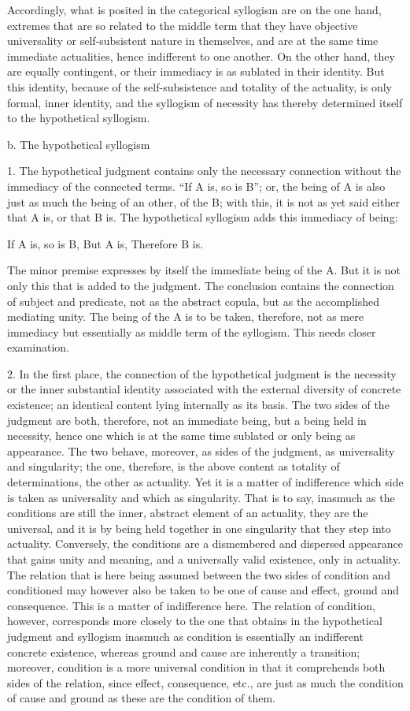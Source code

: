 Accordingly, what is posited
in the categorical syllogism are
on the one hand,
extremes that are so related to the middle term
that they have objective universality
or self-subsistent nature in themselves,
and are at the same time immediate actualities,
hence indifferent to one another.
On the other hand,
they are equally contingent,
or their immediacy is as sublated in their identity.
But this identity, because of the self-subsistence
and totality of the actuality,
is only formal, inner identity,
and the syllogism of necessity has thereby
determined itself to the hypothetical syllogism.

b. The hypothetical syllogism

1. The hypothetical judgment contains only
the necessary connection without
the immediacy of the connected terms.
“If A is, so is B”;
or, the being of A is also just as much
the being of an other, of the B;
with this, it is not as yet said either that A is, or that B is.
The hypothetical syllogism adds this immediacy of being:

If A is, so is B,
But A is,
Therefore B is.

The minor premise expresses by itself
the immediate being of the A.
But it is not only this that is added to the judgment.
The conclusion contains the connection of subject and predicate,
not as the abstract copula,
but as the accomplished mediating unity.
The being of the A is to be taken, therefore,
not as mere immediacy but essentially
as middle term of the syllogism.
This needs closer examination.

2. In the first place,
the connection of the hypothetical judgment is
the necessity or the inner substantial identity
associated with the external diversity of concrete existence;
an identical content lying internally as its basis.
The two sides of the judgment are both, therefore,
not an immediate being, but a being held in necessity,
hence one which is at the same time sublated
or only being as appearance.
The two behave, moreover, as sides of the judgment,
as universality and singularity;
the one, therefore, is the above content
as totality of determinations,
the other as actuality.
Yet it is a matter of indifference
which side is taken as universality
and which as singularity.
That is to say, inasmuch as
the conditions are still the inner,
abstract element of an actuality,
they are the universal,
and it is by being held together
in one singularity
that they step into actuality.
Conversely, the conditions are
a dismembered and dispersed appearance
that gains unity and meaning,
and a universally valid existence,
only in actuality.
The relation that is here being assumed
between the two sides of condition and conditioned
may however also be taken to be one of
cause and effect, ground and consequence.
This is a matter of indifference here.
The relation of condition, however,
corresponds more closely to the one that
obtains in the hypothetical judgment and syllogism
inasmuch as condition is essentially
an indifferent concrete existence,
whereas ground and cause are inherently a transition;
moreover, condition is a more universal condition
in that it comprehends both sides of the relation,
since effect, consequence, etc.,
are just as much the condition of cause and ground
as these are the condition of them.

